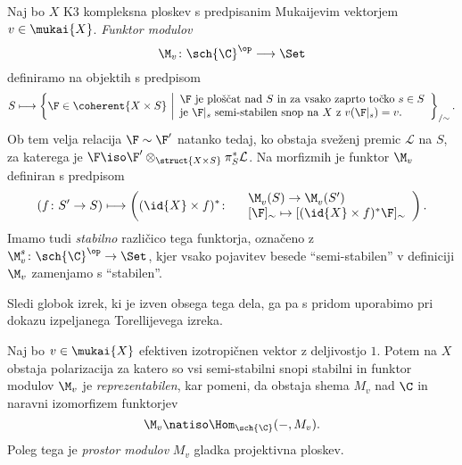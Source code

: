 \begin{definicija}
    Naj bo $X$ K3 kompleksna ploskev s predpisanim Mukaijevim vektorjem $v \in \mukai{X}$. \emph{Funktor modulov} 
    \[
        \M_v \colon \sch{\C}^\op \longrightarrow \Set
    \]
    definiramo na objektih s predpisom
    \[
        S \longmapsto \left\{\F \in \coherent{X \times S} \ \middle| 
        \begin{array}{l}
            \text{$\F$ je ploščat nad $S$ in za vsako zaprto točko $s \in S$} \\
            \text{je $\F|_s$ semi-stabilen snop na $X$ z $v(\F|_s) = v$.}
        \end{array}
        \right\}_{/\sim}.
    \]
    Ob tem velja relacija $\F \sim \F'$ natanko tedaj, ko obstaja sveženj premic $\mathcal L$ na $S$, za katerega je $\F \iso \F' \otimes_{\struct{X \times S}} \pi_S^*\mathcal L$. Na morfizmih je funktor $\M_v$ definiran s predpisom
    \[
        (f\colon S' \to S) \longmapsto \left( (\id{X} \times f)^* \colon
            \begin{array}{r l}
                & \M^{}_v(S) \to \M^{}_v(S') \\
                & [\F]_\sim \mapsto [(\id{X} \times f)^*\F]_\sim
            \end{array}
            \right).
    \]
    Imamo tudi \emph{stabilno} različico tega funktorja, označeno z $\M_v^{s} \colon \sch{\C}^\op \to \Set$, kjer vsako pojavitev besede ``semi-stabilen'' v definiciji $\M_v$ zamenjamo s ``stabilen''.
\end{definicija}

Sledi globok izrek, ki je izven obsega tega dela, ga pa s pridom uporabimo pri dokazu izpeljanega Torellijevega izreka. 

\begin{izrek}
    \emph{\cite{GottscheHuybrechts1996,huybrechts2006fouriermukai, OGrady1997,HuybrechtsLehn2010,BayerMacri2014}}
    Naj bo $v \in \mukai{X}$ efektiven izotropičnen vektor z deljivostjo $1$. Potem na $X$ obstaja polarizacija za katero so vsi semi-stabilni snopi stabilni in funktor modulov $\M_v$ je \emph{reprezentabilen}, kar pomeni, da obstaja shema $M_v$ nad $\C$ in naravni izomorfizem funktorjev 
    \[
        \M_v \natiso \Hom_{\sch{\C}}(-, M_v).
    \]
    Poleg tega je \emph{prostor modulov} $M_v$ gladka projektivna ploskev. 
\end{izrek}

